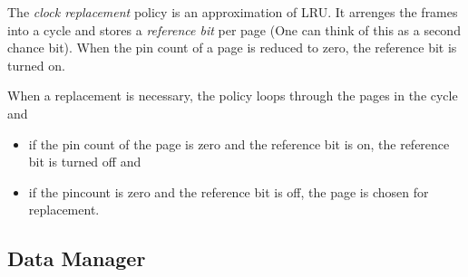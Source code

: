 The \emph{clock replacement} policy is an approximation of LRU. It arrenges the frames into a cycle and stores a \emph{reference bit} per page (One can think of this as a second chance bit). When the pin count of a page is reduced to zero, the reference bit is turned on.

When a replacement is necessary, the policy loops through the pages in the cycle and
\begin{itemize}
\item if the pin count of the page is zero and the reference bit is on, the reference bit is turned off and
\item if the pincount is zero and the reference bit is off, the page is chosen for replacement.
\end{itemize}





\subsection{Data Manager}

\todo


